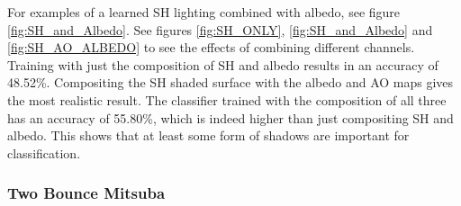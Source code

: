 \documentclass[10pt,twocolumn,letterpaper]{article}
\begin{document}
For examples of a learned SH lighting combined with albedo, see figure \ref{fig:SH_and_Albedo}.  See figures \ref{fig:SH_ONLY}, \ref{fig:SH_and_Albedo} and \ref{fig:SH_AO_ALBEDO} to see the effects of combining different channels. Training with just the composition of SH and albedo results in an accuracy of 48.52\%.   Compositing the SH shaded surface with the albedo and AO maps gives the most realistic result.  The classifier trained with the composition of all three has an accuracy of 55.80\%, which is indeed higher than just compositing SH and albedo.  This shows that at least some form of shadows are important for classification.


\subsubsection{Two Bounce Mitsuba}\label{sec:2bounce}
\end{document}
